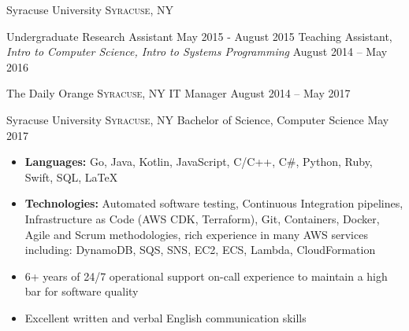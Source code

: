 \documentclass[10pt,a4paper]{article}
\begin{document}
\headedsection  %
  {Syracuse University}
  {\textsc{Syracuse, NY}} {%
  \headedsubsection
    {Undergraduate Research Assistant}
    {May 2015 - August 2015}
    {}
    \headedsubsection
    {Teaching Assistant, \it{Intro to Computer Science, Intro to Systems Programming}}
    {August 2014 -- May 2016}
{}

}

\headedsection  %
  {The Daily Orange}
  {\textsc{Syracuse, NY}} {%
  \headedsubsection
    {IT Manager}
    {August 2014 -- May 2017}
    {}
}

\spacedhrule{0.9em}{-0.4em}


\headedsection
  {Syracuse University}
  {\textsc{Syracuse, NY}} {%
  \headedsubsection
    {Bachelor of Science, Computer Science}
    {May 2017}
{
}
}

\spacedhrule{0.9em}{-0.4em}


\begin{itemize}
\item 
  \textbf{Languages:}
  {Go, Java, Kotlin, JavaScript, C/C++, C\#, Python, Ruby, Swift, SQL, \LaTeX}

\item
  \textbf{Technologies:}
  {Automated software testing, Continuous Integration pipelines, Infrastructure as Code (AWS CDK, Terraform), Git, Containers, Docker, Agile and Scrum methodologies, rich experience in many AWS services including: DynamoDB, SQS, SNS, EC2, ECS, Lambda, CloudFormation }
\item 6+ years of 24/7 operational support on-call experience to maintain a high bar for software quality
\item Excellent written and verbal English communication skills
\end{itemize}
\end{document}
